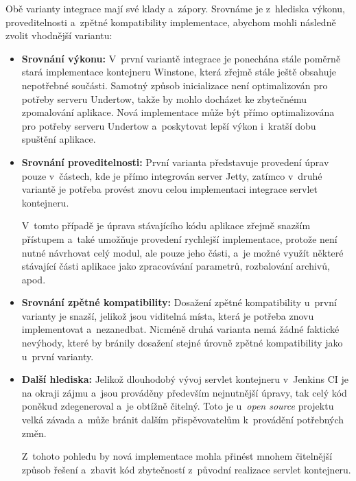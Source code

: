             \noindent Obě varianty integrace mají své klady a~zápory. 
            Srovnáme je z~hlediska výkonu, proveditelnosti a~zpětné kompatibility
            implementace, abychom mohli následně zvolit vhodnější variantu:

            \begin{itemize}
                \item{\textbf{Srovnání výkonu:} V~první variantě integrace je ponechána stále
                 poměrně stará implementace kontejneru Winstone, která zřejmě stále ještě
                 obsahuje nepotřebné součásti. Samotný způsob inicializace není optimalizován
                 pro potřeby serveru Undertow, takže by mohlo docházet ke zbytečnému
                 zpomalování aplikace.
                 Nová implementace může být přímo optimalizována pro potřeby 
                 serveru Undertow a~poskytovat lepší výkon i~kratší dobu spuštění aplikace.}

                \item{\textbf{Srovnání proveditelnosti:} První varianta představuje provedení 
                    úprav pouze v~částech, kde je přímo integrován server Jetty, 
                    zatímco v~druhé variantě je potřeba provést znovu celou implementaci
                    integrace servlet kontejneru. 
                                         
                    V~tomto případě je úprava stávajícího kódu aplikace
                    zřejmě snazším přístupem a~také umožňuje provedení rychlejší
                    implementace, protože není nutné návrhovat celý modul,
                    ale pouze jeho části, a~je možné využít některé stávající části aplikace
                    jako zpracovávání parametrů, rozbalování archivů, apod.}

                \item{\textbf{Srovnání zpětné kompatibility:} Dosažení zpětné kompatibility
                    u~první varianty je snazší, jelikož jsou viditelná místa, která je 
                    potřeba znovu implementovat a~nezanedbat. Nicméně druhá varianta
                    nemá žádné faktické nevýhody, které by bránily dosažení 
                    stejné úrovně zpětné kompatibility jako u~první varianty.}

                \item{\textbf{Další hlediska:} Jelikož dlouhodobý vývoj servlet kontejneru
                    v~Jenkins CI je na okraji zájmu a~jsou prováděny především nejnutnější úpravy, 
                    tak celý kód poněkud zdegeneroval a~je obtížně čitelný. Toto
                    je u~\emph{open source} projektu velká závada 
                    a~může bránit dalším přispěvovatelům k~provádění potřebných změn.

                    Z~tohoto pohledu by nová implementace mohla přinést mnohem čitelnější
                    způsob řešení a~zbavit kód zbytečností z~původní realizace servlet kontejneru.}
            \end{itemize}



